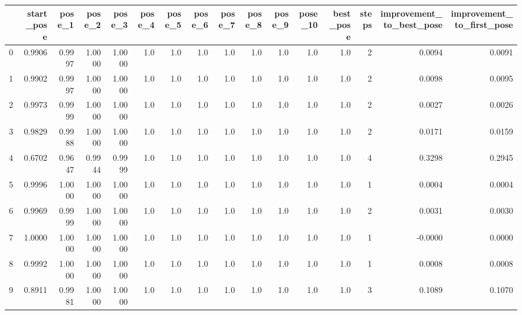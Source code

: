 \begin{tabular}{lrrrrrrrrrrrrrrr}
\toprule
{} &  start\_pose &  pose\_1 &  pose\_2 &  pose\_3 &  pose\_4 &  pose\_5 &  pose\_6 &  pose\_7 &  pose\_8 &  pose\_9 &  pose\_10 &  best\_pose &  steps &  improvement\_to\_best\_pose &  improvement\_to\_first\_pose \\
\midrule
0   &      0.9906 &  0.9997 &  1.0000 &  1.0000 &     1.0 &     1.0 &     1.0 &     1.0 &     1.0 &     1.0 &      1.0 &        1.0 &      2 &                    0.0094 &                     0.0091 \\
1   &      0.9902 &  0.9997 &  1.0000 &  1.0000 &     1.0 &     1.0 &     1.0 &     1.0 &     1.0 &     1.0 &      1.0 &        1.0 &      2 &                    0.0098 &                     0.0095 \\
2   &      0.9973 &  0.9999 &  1.0000 &  1.0000 &     1.0 &     1.0 &     1.0 &     1.0 &     1.0 &     1.0 &      1.0 &        1.0 &      2 &                    0.0027 &                     0.0026 \\
3   &      0.9829 &  0.9988 &  1.0000 &  1.0000 &     1.0 &     1.0 &     1.0 &     1.0 &     1.0 &     1.0 &      1.0 &        1.0 &      2 &                    0.0171 &                     0.0159 \\
4   &      0.6702 &  0.9647 &  0.9944 &  0.9999 &     1.0 &     1.0 &     1.0 &     1.0 &     1.0 &     1.0 &      1.0 &        1.0 &      4 &                    0.3298 &                     0.2945 \\
5   &      0.9996 &  1.0000 &  1.0000 &  1.0000 &     1.0 &     1.0 &     1.0 &     1.0 &     1.0 &     1.0 &      1.0 &        1.0 &      1 &                    0.0004 &                     0.0004 \\
6   &      0.9969 &  0.9999 &  1.0000 &  1.0000 &     1.0 &     1.0 &     1.0 &     1.0 &     1.0 &     1.0 &      1.0 &        1.0 &      2 &                    0.0031 &                     0.0030 \\
7   &      1.0000 &  1.0000 &  1.0000 &  1.0000 &     1.0 &     1.0 &     1.0 &     1.0 &     1.0 &     1.0 &      1.0 &        1.0 &      1 &                   -0.0000 &                     0.0000 \\
8   &      0.9992 &  1.0000 &  1.0000 &  1.0000 &     1.0 &     1.0 &     1.0 &     1.0 &     1.0 &     1.0 &      1.0 &        1.0 &      1 &                    0.0008 &                     0.0008 \\
9   &      0.8911 &  0.9981 &  1.0000 &  1.0000 &     1.0 &     1.0 &     1.0 &     1.0 &     1.0 &     1.0 &      1.0 &        1.0 &      3 &                    0.1089 &                     0.1070 \\

\end{tabular}
